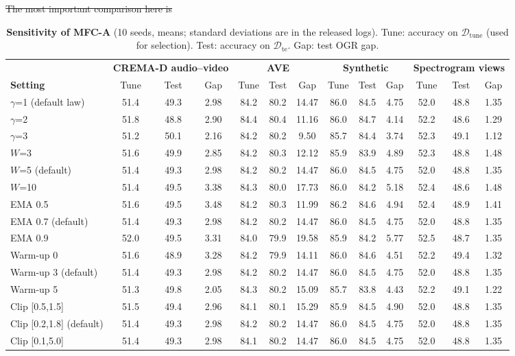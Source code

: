 \documentclass[fleqn,10pt]{wlscirep}
\providecommand{\DIFdel}[1]{{\protect\color{red}\sout{#1}}} %
\providecommand{\DIFaddbegin}{} %
\providecommand{\DIFdelbegin}{} %
\providecommand{\DIFdelend}{} %
\begin{document}
\DIFdelbegin \DIFdel{The most important comparison here is }\DIFdelend \DIFaddbegin \begin{table}[t]
\caption{\textbf{Sensitivity of MFC-A} (10 seeds, means; standard deviations are in the released logs). Tune: accuracy on $\mathcal{D}_{\mathrm{tune}}$ (used for selection). Test: accuracy on $\mathcal{D}_{\mathrm{te}}$. Gap: test OGR gap.}
\label{tab:sens}
\centering
\footnotesize
\setlength{\tabcolsep}{2.5pt}
\begin{tabular}{@{}lcccccccccccc@{}}
\toprule
& \multicolumn{3}{c}{\textbf{CREMA-D audio--video}} & \multicolumn{3}{c}{\textbf{AVE}} & \multicolumn{3}{c}{\textbf{Synthetic}} & \multicolumn{3}{c}{\textbf{Spectrogram views}} \\
\cmidrule(lr){2-4}\cmidrule(lr){5-7}\cmidrule(lr){8-10}\cmidrule(lr){11-13}
\textbf{Setting} & Tune & Test & Gap & Tune & Test & Gap & Tune & Test & Gap & Tune & Test & Gap \\ \midrule
$\gamma$=1 (default law) & 51.4 & 49.3 & 2.98 & 84.2 & 80.2 & 14.47 & 86.0 & 84.5 & 4.75 & 52.0 & 48.8 & 1.35 \\
$\gamma$=2 & 51.8 & 48.8 & 2.90 & 84.4 & 80.4 & 11.16 & 86.0 & 84.7 & 4.14 & 52.2 & 48.6 & 1.29 \\
$\gamma$=3 & 51.2 & 50.1 & 2.16 & 84.2 & 80.2 & 9.50 & 85.7 & 84.4 & 3.74 & 52.3 & 49.1 & 1.12 \\
$W$=3 & 51.6 & 49.9 & 2.85 & 84.2 & 80.3 & 12.12 & 85.9 & 83.9 & 4.89 & 52.3 & 48.8 & 1.48 \\
$W$=5 (default) & 51.4 & 49.3 & 2.98 & 84.2 & 80.2 & 14.47 & 86.0 & 84.5 & 4.75 & 52.0 & 48.8 & 1.35 \\
$W$=10 & 51.4 & 49.5 & 3.38 & 84.3 & 80.0 & 17.73 & 86.0 & 84.2 & 5.18 & 52.4 & 48.6 & 1.48 \\
EMA 0.5 & 51.6 & 49.5 & 3.48 & 84.2 & 80.3 & 11.99 & 86.2 & 84.6 & 4.94 & 52.4 & 48.9 & 1.41 \\
EMA 0.7 (default) & 51.4 & 49.3 & 2.98 & 84.2 & 80.2 & 14.47 & 86.0 & 84.5 & 4.75 & 52.0 & 48.8 & 1.35 \\
EMA 0.9 & 52.0 & 49.5 & 3.31 & 84.0 & 79.9 & 19.58 & 85.9 & 84.2 & 5.77 & 52.5 & 48.7 & 1.35 \\
Warm-up 0 & 51.6 & 48.9 & 3.28 & 84.2 & 79.9 & 14.11 & 86.0 & 84.6 & 4.51 & 52.2 & 49.4 & 1.32 \\
Warm-up 3 (default) & 51.4 & 49.3 & 2.98 & 84.2 & 80.2 & 14.47 & 86.0 & 84.5 & 4.75 & 52.0 & 48.8 & 1.35 \\
Warm-up 5 & 51.3 & 49.8 & 2.05 & 84.3 & 80.2 & 15.09 & 85.7 & 83.8 & 4.43 & 52.2 & 49.1 & 1.22 \\
Clip [0.5,1.5] & 51.5 & 49.4 & 2.96 & 84.1 & 80.1 & 15.29 & 85.9 & 84.5 & 4.90 & 52.0 & 48.8 & 1.35 \\
Clip [0.2,1.8] (default) & 51.4 & 49.3 & 2.98 & 84.2 & 80.2 & 14.47 & 86.0 & 84.5 & 4.75 & 52.0 & 48.8 & 1.35 \\
Clip [0.1,5.0] & 51.4 & 49.3 & 2.98 & 84.1 & 80.2 & 14.47 & 86.0 & 84.5 & 4.75 & 52.0 & 48.8 & 1.35 \\
\bottomrule
\end{tabular}
\end{table}
\end{document}
